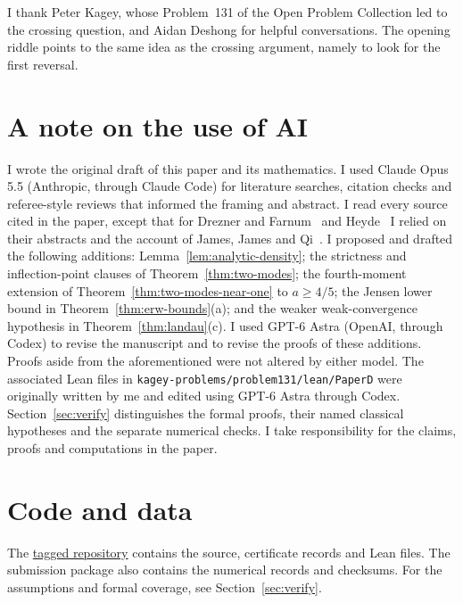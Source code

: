 \documentclass[EJP,preprint]{ejpecp}
\begin{document}
\raggedbottom








\begin{acks}
I thank Peter Kagey, whose Problem~131 of the Open Problem Collection
\cite{kagey131} led to the crossing question, and Aidan Deshong for
helpful conversations.
The opening riddle points to the same idea as the crossing argument,
namely to look for the first reversal.
\end{acks}

\section*{A note on the use of AI}
I wrote the original draft of this paper and its mathematics. I used Claude
Opus 5.5 (Anthropic, through Claude Code) for literature searches, citation
checks and referee-style reviews that informed the framing and abstract.
I read every source cited in the paper, except that for Drezner and
Farnum~\cite{dreznerfarnum1993} and Heyde~\cite{heyde2004} I relied on their
abstracts and the account of James, James and Qi~\cite{jamesjamesqi2008}.
I proposed and drafted the following
additions: Lemma~\ref{lem:analytic-density}; the strictness and
inflection-point clauses of Theorem~\ref{thm:two-modes}; the fourth-moment
extension of Theorem~\ref{thm:two-modes-near-one} to $a\ge4/5$; the Jensen
lower bound in Theorem~\ref{thm:erw-bounds}(a); and the weaker
weak-convergence hypothesis in Theorem~\ref{thm:landau}(c).
I used GPT-6 Astra (OpenAI, through Codex) to revise the manuscript and to
revise the proofs of these additions. Proofs aside from the aforementioned were not altered by either model.
The associated Lean files in
\nolinkurl{kagey-problems/problem131/lean/PaperD} were originally written by me and edited using
GPT-6 Astra through Codex. Section~\ref{sec:verify} distinguishes the formal
proofs, their named classical hypotheses and the separate numerical checks.
I take responsibility for the claims, proofs and computations in the paper.

\section*{Code and data}
The \href{https://github.com/apemm/Kagey-Problems/tree/paperD-ejp-v1/kagey-problems/problem131/paperD}{tagged repository}
contains the source, certificate records and Lean files.
The submission package also contains the numerical records and
checksums. For the assumptions and formal coverage, see
Section~\ref{sec:verify}.
\end{document}
